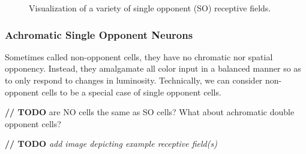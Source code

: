 \documentclass[journal,onecolumn]{IEEEtran}
\begin{document}
\begin{figure}[H]
    \caption{Visualization of a variety of single opponent (SO) receptive fields.}
    \label{fig:rf-so}
\end{figure}

\subsubsection*{Achromatic Single Opponent Neurons}

Sometimes called non-opponent cells, they have no chromatic nor spatial opponency. Instead, they amalgamate all color input in a balanced manner so as to only respond to changes in luminosity. Technically, we can consider non-opponent cells to be a special case of single opponent cells.

\textbf{// TODO} are NO cells the same as SO cells? What about achromatic double opponent cells?

\textbf{// TODO} \textit{add image depicting example receptive field(s)}
\end{document}
